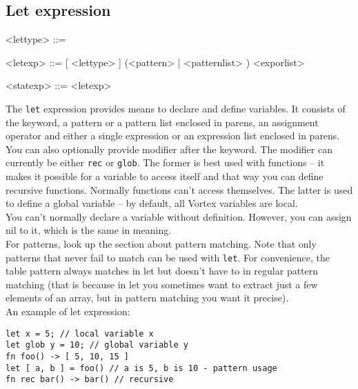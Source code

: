 \documentclass{article}
\newenvironment{bnf}
{
\begin{mdframed}
\begin{grammar}
}
{
\end{grammar}
\end{mdframed}
}
\begin{document}
\subsection{Let expression}
\begin{bnf}
<lettype> ::= 
    \alt {}

<letexp> ::=  [ <lettype> ] (<pattern> | \lit{(} <patternlist>
    \lit{)}) \lit{=} <exporlist>

<statexp> ::= <letexp>
\end{bnf}
The \verb|let| expression provides means to declare and define variables.
It consists of the keyword, a pattern or a pattern list enclosed in parens,
an assignment operator and either a single expression or an expression
list enclosed in parens.\\
You can also optionally provide modifier after the keyword. The modifier
can currently be either \verb|rec| or \verb|glob|. The former is best used
with functions -- it makes it possible for a variable to access itself and
that way you can define recursive functions. Normally functions can't access
themselves. The latter is used to define a global variable -- by default,
all Vortex variables are local.\\
You can't normally declare a variable without definition. However, you can
assign nil to it, which is the same in meaning.\\
For patterns, look up the section about pattern matching. Note that only
patterns that never fail to match can be used with \verb|let|. For convenience,
the table pattern always matches in let but doesn't have to in regular
pattern matching (that is because in let you sometimes want to extract
just a few elements of an array, but in pattern matching you want it
precise).\\
An example of let expression:
\begin{lstlisting}[language=vortex]
let x = 5; // local variable x
let glob y = 10; // global variable y
fn foo() -> [ 5, 10, 15 ]
let [ a, b ] = foo() // a is 5, b is 10 - pattern usage
fn rec bar() -> bar() // recursive
\end{lstlisting}
\end{document}
